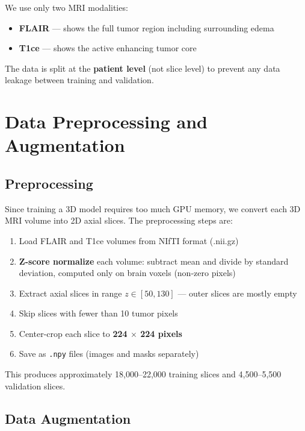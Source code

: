 \documentclass[12pt, a4paper]{article}
\begin{document}
We use only two MRI modalities:
\begin{itemize}
    \item \textbf{FLAIR} — shows the full tumor region including surrounding edema
    \item \textbf{T1ce} — shows the active enhancing tumor core
\end{itemize}

The data is split at the \textbf{patient level} (not slice level) to prevent any data leakage between training and validation.

\section{Data Preprocessing and Augmentation}

\subsection{Preprocessing}

Since training a 3D model requires too much GPU memory, we convert each 3D MRI volume into 2D axial slices. The preprocessing steps are:

\begin{enumerate}
    \item Load FLAIR and T1ce volumes from NIfTI format (.nii.gz)
    \item \textbf{Z-score normalize} each volume: subtract mean and divide by standard deviation, computed only on brain voxels (non-zero pixels)
    \item Extract axial slices in range $z \in [50, 130]$ — outer slices are mostly empty
    \item Skip slices with fewer than 10 tumor pixels
    \item Center-crop each slice to \textbf{224 $\times$ 224 pixels}
    \item Save as \texttt{.npy} files (images and masks separately)
\end{enumerate}

This produces approximately 18,000--22,000 training slices and 4,500--5,500 validation slices.

\subsection{Data Augmentation}
\end{document}
